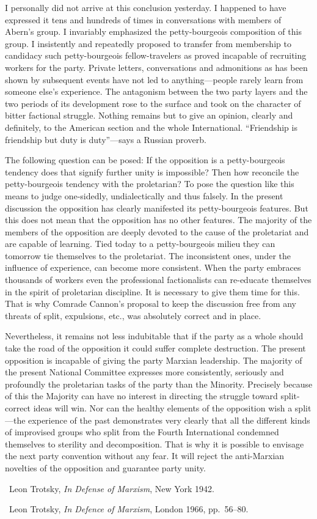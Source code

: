 I personally did not arrive at this conclusion yesterday. I happened to have expressed it tens and hundreds of times in conversations with members of Abern’s group. I invariably emphasized the petty-bourgeois composition of this group. I insistently and repeatedly proposed to transfer from membership to candidacy such petty-bourgeois fellow-travelers as proved incapable of recruiting workers for the party. Private letters, conversations and admonitions as has been shown by subsequent events have not led to anything---people rarely learn from someone else’s experience. The antagonism between the two party layers and the two periods of its development rose to the surface and took on the character of bitter factional struggle. Nothing remains but to give an opinion, clearly and definitely, to the American section and the whole International. “Friendship is friendship but duty is duty”---says a Russian proverb.

The following question can be posed: If the opposition is a petty-bourgeois tendency does that signify further unity is impossible? Then how reconcile the petty-bourgeois tendency with the proletarian? To pose the question like this means to judge one-sidedly, undialectically and thus falsely. In the present discussion the opposition has clearly manifested its petty-bourgeois features. But this does not mean that the opposition has no other features. The majority of the members of the opposition are deeply devoted to the cause of the proletariat and are capable of learning. Tied today to a petty-bourgeois milieu they can tomorrow tie themselves to the proletariat. The inconsistent ones, under the influence of experience, can become more consistent. When the party embraces thousands of workers even the professional factionalists can re-educate themselves in the spirit of proletarian discipline. It is necessary to give them time for this. That is why Comrade Cannon’s proposal to keep the discussion free from any threats of split, expulsions, etc., was absolutely correct and in place.

Nevertheless, it remains not less indubitable that if the party as a whole should take the road of the opposition it could suffer complete destruction. The present opposition is incapable of giving the party Marxian leadership. The majority of the present National Committee expresses more consistently, seriously and profoundly the proletarian tasks of the party than the Minority. Precisely because of this the Majority can have no interest in directing the struggle toward split-correct ideas will win. Nor can the healthy elements of the opposition wish a split---the experience of the past demonstrates very clearly that all the different kinds of improvised groups who split from the Fourth International condemned themselves to sterility and decomposition. That is why it is possible to envisage the next party convention without any fear. It will reject the anti-Marxian novelties of the opposition and guarantee party unity.

\begin{letterinfo}
  \firstpublished\ Leon Trotsky, \emph{In Defense of Marxism}, New York 1942.
  
  \checkedagainst\ Leon Trotsky, \emph{In Defence of Marxism}, London 1966, pp.~56--80.
\end{letterinfo}